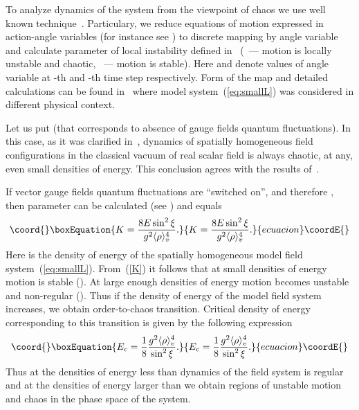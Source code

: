 \documentclass[a4paper,12pt]{article}
\begin{document}
To analyze dynamics of the system from the viewpoint of chaos we use well known
technique~\cite{Zaslavsky, Rep}. Particulary, we reduce equations of motion expressed
in action-angle variables (for instance see \cite{Lihtenberg}) to discrete mapping by
angle variable \myHighlight{$\overline{\psi}$}\coordHE{} and calculate parameter of local instability
\coordHE{} defined
in~\cite{Rep} (\coordHE{}~--- motion is locally unstable and chaotic, \coordHE{}~--- motion
is stable). Here \coordHE{} and \coordHE{} denote values of
angle variable at \coordHE{}-th and \coordHE{}-th time step respectively. Form of the map and
detailed calculations can be found in~\cite{we3} where model system~(\ref{eq:smallL})
was considered in different physical context.

Let us put \coordHE{} (that corresponds to absence of gauge fields
quantum fluctuations). In this case, as it was clarified in~\cite{Savvidy}, dynamics
of spatially homogeneous field configurations in the classical vacuum of real scalar
field is always chaotic, at any, even small densities of energy. This conclusion
agrees with the results of~\cite{regular, Salasnich, we3}.


If vector gauge fields quantum fluctuations are ``switched on'', and therefore
\coordHE{}, then parameter \coordHE{} can be calculated (see
\cite{we3}) and equals
\begin{equation}\coord{}\boxEquation{\label{K}
  K=\frac{8E\sin^{2}{\xi}}{g^{2}\langle \rho\rangle_{v}^{4}}.
}{K=\frac{8E\sin^{2}{\xi}}{g^{2}\langle \rho\rangle_{v}^{4}}.
}{ecuacion}\coordE{}\end{equation}
Here \coordHE{} is the density of energy of the spatially homogeneous model field
system~(\ref{eq:smallL}). From~(\ref{K}) it follows that at small densities of energy
motion is stable (\coordHE{}). At large enough densities of energy motion becomes unstable
and non-regular (\coordHE{}). Thus if the density of energy of the model field system
increases, we obtain order-to-chaos transition. Critical density of energy \coordHE{}
corresponding to this transition is given by the following expression
\begin{equation*}\coord{}\boxEquation{ 
E_{c}=\frac{1}{8}\frac{g^{2}\langle \rho\rangle_{v}^{4}}{\sin^{2}{\xi}}.
}{ 
E_{c}=\frac{1}{8}\frac{g^{2}\langle \rho\rangle_{v}^{4}}{\sin^{2}{\xi}}.
}{ecuacion}\coordE{}\end{equation*}
Thus at the densities of energy less than \coordHE{} dynamics of the field system is
regular and at the densities of energy larger than \coordHE{} we obtain regions of
unstable motion and chaos in the phase space of the system.
\end{document}
